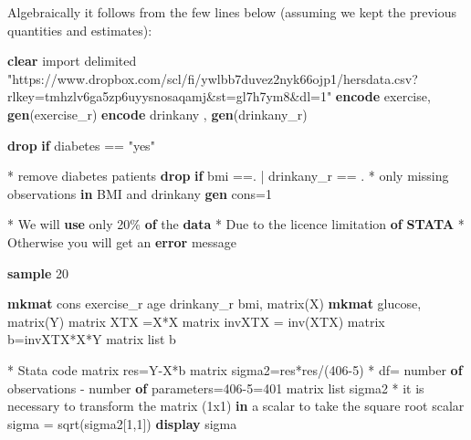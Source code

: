 \documentclass[
  letterpaper,
  DIV=11,
  numbers=noendperiod]{scrreprt}
\newenvironment{Shaded}{\begin{snugshade}}{\end{snugshade}}
\newcommand{\FunctionTok}[1]{\textcolor[rgb]{0.28,0.35,0.67}{#1}}
\newcommand{\KeywordTok}[1]{\textcolor[rgb]{0.00,0.23,0.31}{\textbf{#1}}}
\newcommand{\NormalTok}[1]{\textcolor[rgb]{0.00,0.23,0.31}{#1}}
\newcommand{\OtherTok}[1]{\textcolor[rgb]{0.00,0.23,0.31}{#1}}
\newcommand{\StringTok}[1]{\textcolor[rgb]{0.13,0.47,0.30}{#1}}
\begin{document}
Algebraically it follows from the few lines below (assuming we kept the
previous quantities and estimates):

\begin{Shaded}
\begin{Highlighting}[]
\KeywordTok{clear}
\NormalTok{import delimited }\StringTok{"https://www.dropbox.com/scl/fi/ywlbb7duvez2nyk66ojp1/hersdata.csv?rlkey=tmhzlv6ga5zp6uyysnosaqamj\&st=gl7h7ym8\&dl=1"}
\KeywordTok{encode}\NormalTok{  exercise, }\KeywordTok{gen}\NormalTok{(exercise\_r)}
\KeywordTok{encode}\NormalTok{ drinkany , }\KeywordTok{gen}\NormalTok{(drinkany\_r)}

\KeywordTok{drop} \KeywordTok{if}\NormalTok{ diabetes == }\StringTok{"yes"}

\NormalTok{* remove diabetes patients}
\KeywordTok{drop} \KeywordTok{if}\NormalTok{ bmi ==. | drinkany\_r == . }
\NormalTok{* only }\FunctionTok{missing}\NormalTok{ observations }\KeywordTok{in}\NormalTok{ BMI and drinkany}
\KeywordTok{gen}\NormalTok{ cons=1}


\NormalTok{* We will }\KeywordTok{use}\NormalTok{ only 20\% }\KeywordTok{of}\NormalTok{ the }\KeywordTok{data}
\NormalTok{* Due to the licence limitation }\KeywordTok{of} \KeywordTok{STATA}
\NormalTok{* Otherwise you will }\FunctionTok{get}\NormalTok{ an }\KeywordTok{error}\NormalTok{ message}

\KeywordTok{sample}\NormalTok{ 20}


\KeywordTok{mkmat}\NormalTok{ cons exercise\_r age drinkany\_r bmi, }\FunctionTok{matrix}\NormalTok{(X) }
\KeywordTok{mkmat}\NormalTok{ glucose, }\FunctionTok{matrix}\NormalTok{(Y)}
\FunctionTok{matrix}\NormalTok{ XTX =X\textquotesingle{}*X}
\FunctionTok{matrix}\NormalTok{ invXTX = }\FunctionTok{inv}\NormalTok{(XTX)}
\FunctionTok{matrix}\NormalTok{ b=invXTX*X\textquotesingle{}*Y}
\FunctionTok{matrix} \OtherTok{list}\NormalTok{ b }



\NormalTok{* Stata code}
\FunctionTok{matrix}\NormalTok{ res=Y{-}X*b}
\FunctionTok{matrix}\NormalTok{ sigma2=res\textquotesingle{}*res/(406{-}5)}
\NormalTok{* df= number }\KeywordTok{of}\NormalTok{ observations {-} number }\KeywordTok{of}\NormalTok{ parameters=406{-}5=401}
\FunctionTok{matrix} \OtherTok{list}\NormalTok{ sigma2}
\NormalTok{* it is necessary to transform the }\FunctionTok{matrix}\NormalTok{ (1x1) }\KeywordTok{in}\NormalTok{ a }\FunctionTok{scalar}\NormalTok{ to take the square root}
\FunctionTok{scalar}\NormalTok{ sigma = }\FunctionTok{sqrt}\NormalTok{(sigma2[1,1])}
\KeywordTok{display}\NormalTok{ sigma}



\end{Highlighting}
\end{Shaded}
\end{document}
